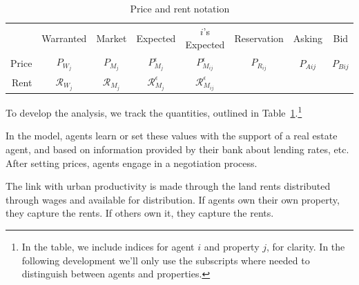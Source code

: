 \begin{table}[!ht]
\centering
{\renewcommand{\arraystretch}{1.6}
\begin{tabular}{r|c|c|c|c|c|c|c|}\cline{2-8}
       & Warranted  & Market & Expected & $i$'s Expected & Reservation & Asking & Bid     \\ \cline{2-8}
Price  & $P_{W_j}$      & $P_{M_j}$  & $P_{M_j}^\epsilon$ & $P_{M_{ij}}^{\epsilon}$     & $P_{R_{ij}}$       & $P_{A{ij}}$  & $P_{B{ij}}$   \\ \cline{2-8}
Rent  & $\mathcal{R}_{W_j}$      & $\mathcal{R}_{M_j}$  & $\mathcal{R}_{M_j}^\epsilon$ & $\mathcal{R}_{M_{ij}}^{\epsilon}$     &       &   &   \\ \cline{2-8}
\end{tabular}
 }   
\caption{Price and rent notation}
\label{table-price-notation}
\end{table}

To develop the analysis, we track the quantities, outlined in Table~\ref{table-price-notation}.\footnote{In the table, we include indices for agent $i$ and property $j$, for clarity. In the following development we'll only use the subscripts where needed to distinguish between agents and properties.}

In the model, agents learn or set these values with the support of a real estate agent, and based on information provided by their bank about lending rates, etc. After setting prices, agents engage in a negotiation process. 

The link with urban productivity is made through the land rents distributed through wages and available for distribution. If agents own their own property, they capture the rents. If others own it, they capture the rents.


